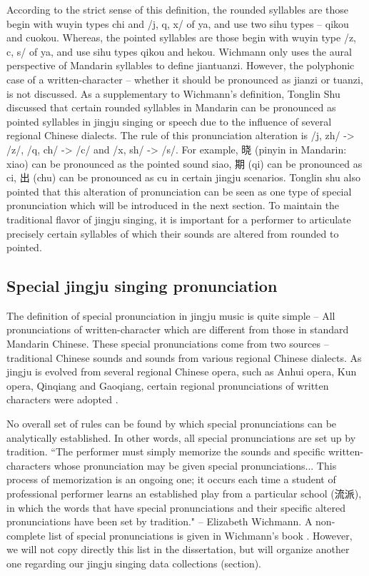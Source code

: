 According to the strict sense of this definition, the rounded syllables are those begin with wuyin types chi and /j, q, x/ of ya, and use two sihu types -- qikou and cuokou. Whereas, the pointed syllables are those begin with wuyin type /z, c, s/ of ya, and use sihu types qikou and hekou. Wichmann only uses the aural perspective of Mandarin syllables to define jiantuanzi. However, the polyphonic case of a written-character -- whether it should be pronounced as jianzi or tuanzi, is not discussed. As a supplementary to Wichmann’s definition, Tonglin Shu \cite{TonglinShu2011a} discussed that certain rounded syllables in Mandarin can be pronounced as pointed syllables in jingju singing or speech due to the influence of several regional Chinese dialects. The rule of this pronunciation alteration is /j, zh/ -> /z/, /q, ch/ -> /c/ and /x, sh/ -> /s/. For example, 晓 (pinyin in Mandarin: xiao) can be pronounced as the pointed sound siao, 期 (qi) can be pronounced as ci, 出 (chu) can be pronounced as cu in certain jingju scenarios. Tonglin shu also pointed that this alteration of pronunciation can be seen as one type of special pronunciation which will be introduced in the next section. To maintain the traditional flavor of jingju singing, it is important for a performer to articulate precisely certain syllables of which their sounds are altered from rounded to pointed.

\subsection{Special jingju singing pronunciation}

The definition of special pronunciation in jingju music is quite simple -- All pronunciations of written-character which are different from those in standard Mandarin Chinese. These special pronunciations come from two sources -- traditional Chinese sounds and sounds from various regional Chinese dialects. As jingju is evolved from several regional Chinese opera, such as Anhui opera, Kun opera, Qinqiang and Gaoqiang, certain regional pronunciations of written characters were adopted \cite{Wichmann1991a}.

No overall set of rules can be found by which special pronunciations can be analytically established. In other words, all special pronunciations are set up by tradition. ``The performer must simply memorize the sounds and specific written-characters whose pronunciation may be given special pronunciations... This process of memorization is an ongoing one; it occurs each time a student of professional performer learns an established play from a particular school (流派), in which the words that have special pronunciations and their specific altered pronunciations have been set by tradition." -- Elizabeth Wichmann. A non-complete list of special pronunciations is given in Wichmann’s book \cite{Wichmann1991a}. However, we will not copy directly this list in the dissertation, but will organize another one regarding our jingju singing data collections (section).

